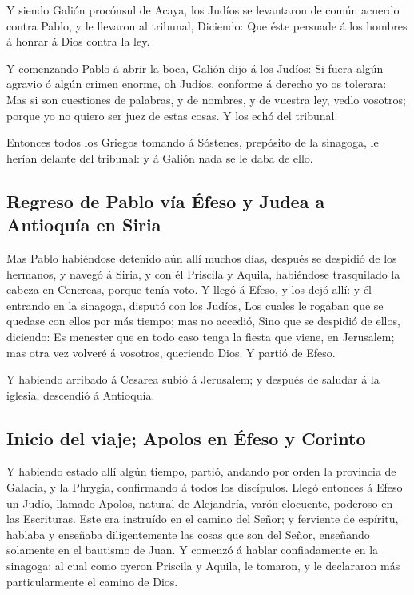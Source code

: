  Y siendo Galión procónsul de Acaya, los Judíos se
levantaron de común acuerdo contra Pablo, y le llevaron al tribunal,
 Diciendo: Que éste persuade á los hombres á honrar á Dios
contra la ley.

 Y comenzando Pablo á abrir la boca, Galión dijo á los
Judíos: Si fuera algún agravio ó algún crimen enorme, oh Judíos,
conforme á derecho yo os tolerara:  Mas si son cuestiones
de palabras, y de nombres, y de vuestra ley, vedlo vosotros; porque yo
no quiero ser juez de estas cosas.  Y los echó del
tribunal.

 Entonces todos los Griegos tomando á Sóstenes, prepósito
de la sinagoga, le herían delante del tribunal: y á Galión nada se le
daba de ello.

\hypertarget{regreso-de-pablo-vuxeda-uxe9feso-y-judea-a-antioquuxeda-en-siria}{%
\subsection{Regreso de Pablo vía Éfeso y Judea a Antioquía en
Siria}\label{regreso-de-pablo-vuxeda-uxe9feso-y-judea-a-antioquuxeda-en-siria}}

 Mas Pablo habiéndose detenido aún allí muchos días,
después se despidió de los hermanos, y navegó á Siria, y con él Priscila
y Aquila, habiéndose trasquilado la cabeza en Cencreas, porque tenía
voto.  Y llegó á Efeso, y los dejó allí: y él entrando en
la sinagoga, disputó con los Judíos,  Los cuales le rogaban
que se quedase con ellos por más tiempo; mas no accedió, 
Sino que se despidió de ellos, diciendo: Es menester que en todo caso
tenga la fiesta que viene, en Jerusalem; mas otra vez volveré á
vosotros, queriendo Dios. Y partió de Efeso.

 Y habiendo arribado á Cesarea subió á Jerusalem; y después
de saludar á la iglesia, descendió á Antioquía.

\hypertarget{inicio-del-viaje-apolos-en-uxe9feso-y-corinto}{%
\subsection{Inicio del viaje; Apolos en Éfeso y
Corinto}\label{inicio-del-viaje-apolos-en-uxe9feso-y-corinto}}

 Y habiendo estado allí algún tiempo, partió, andando por
orden la provincia de Galacia, y la Phrygia, confirmando á todos los
discípulos.  Llegó entonces á Efeso un Judío, llamado
Apolos, natural de Alejandría, varón elocuente, poderoso en las
Escrituras.  Este era instruído en el camino del Señor; y
ferviente de espíritu, hablaba y enseñaba diligentemente las cosas que
son del Señor, enseñando solamente en el bautismo de Juan. 
Y comenzó á hablar confiadamente en la sinagoga: al cual como oyeron
Priscila y Aquila, le tomaron, y le declararon más particularmente el
camino de Dios.

